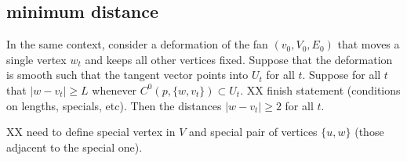 \subsection{minimum distance}

\begin{lemma}\label{dist2} In the same context, consider a deformation
of the fan $(v_0,V_0,E_0)$ that moves a single vertex $w_t$
and keeps all other vertices fixed.  Suppose that the deformation is
smooth such that the tangent vector points into $U_t$ for all $t$.
Suppose for all $t$ that $|w-v_t| \ge L$ whenever
$C^0(p,\{w,v_t\})\subset U_t$.
XX finish statement (conditions on lengths, specials, etc).   
Then the distances $|w-v_t|\ge 2$ for all
$t$.
\end{lemma}

XX need to define special vertex in $V$ and special pair
of vertices $\{u,w\}$ (those adjacent to the special one).


